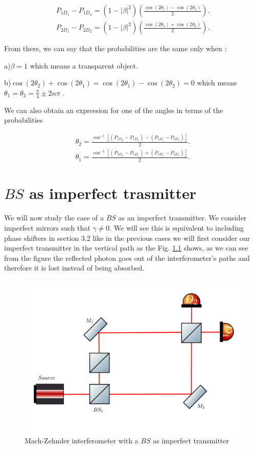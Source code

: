 \documentclass{book}
\begin{document}
\begin{align}
P_{1D_{1}}-P_{1D_{2}}=(1-|\beta|^2)\left(\frac{\cos(2 \theta_{1})-\cos(2 \theta_{2})}{2}\right). \\
P_{2D_{1}}-P_{2D_{2}}=(1-|\beta|^2)\left(\frac{\cos(2 \theta_{1})+\cos(2 \theta_{2})}{2}\right).
\end{align}

From there, we can say that the probabilities are the same only when :

a)$\beta=1  $ which means a transparent object.

b)$\cos(2 \theta_{2})+\cos(2\theta_{1})=\cos(2 \theta_{1})-\cos(2\theta_{2})=0$   which means   $\theta_{1}=\theta_{2}=\frac{\pi}{4}\pm 2n\pi$
.

We can also obtain an expression for one of the angles in terms of the probabilities


\begin{align}
\theta_{2}=\frac{\cos^{-1}[(P_{1D_{2}}-P_{1D_{1}})-(P_{1D_{1}}-P_{2D_{1}})]}{2}.\\
\theta_{1}=\frac{\cos^{-1}[(P_{1D_{2}}-P_{1D_{1}})+(P_{1D_{1}}-P_{2D_{1}})]}{2}.
\end{align}


\pagebreak

\blankpage{}

\chapter{$BS$ as imperfect trasmitter}

We will now study the case of a $BS$ as an imperfect transmitter. We consider imperfect mirrors such that $\gamma \neq 0$. We will see this is equivalent to including phase shifters in section 3.2 like in the previous cases we will first consider our imperfect transmitter in the vertical path as the Fig. \ref{bs vertical} shows, as we can see from the figure the reflected photon goes out of the interferometer's paths and therefore it is lost instead of being absorbed.

\begin{figure}[h!]
\centering
\includegraphics[width=\linewidth,height=7.5 cm]{images/machzenhderbs.png}
\caption{Mach-Zehnder interferometer with a $BS$ as imperfect transmitter}
\label{bs vertical}
\end{figure}
\end{document}
